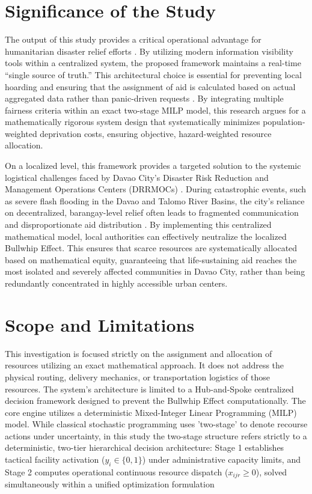 \section{Significance of the Study}
The output of this study provides a critical operational advantage for humanitarian disaster relief efforts \cite{starr2014}. By utilizing modern information visibility tools within a centralized system, the proposed framework maintains a real-time ``single source of truth.'' This architectural choice is essential for preventing local hoarding and ensuring that the assignment of aid is calculated based on actual aggregated data rather than panic-driven requests \cite{sahin2023, wagenaar2017}. By integrating multiple fairness criteria within an exact two-stage MILP model, this research argues for a mathematically rigorous system design that systematically minimizes population-weighted deprivation costs, ensuring objective, hazard-weighted resource allocation.

On a localized level, this framework provides a targeted solution to the systemic logistical challenges faced by Davao City's Disaster Risk Reduction and Management Operations Centers (DRRMOCs) \cite{samson2024}. During catastrophic events, such as severe flash flooding in the Davao and Talomo River Basins, the city's reliance on decentralized, barangay-level relief often leads to fragmented communication and disproportionate aid distribution \cite{cayamanda2021}. By implementing this centralized mathematical model, local authorities can effectively neutralize the localized Bullwhip Effect. This ensures that scarce resources are systematically allocated based on mathematical equity, guaranteeing that life-sustaining aid reaches the most isolated and severely affected communities in Davao City, rather than being redundantly concentrated in highly accessible urban centers.

\section{Scope and Limitations}
This investigation is focused strictly on the assignment and allocation of resources utilizing an exact mathematical approach. It does not address the physical routing, delivery mechanics, or transportation logistics of those resources. The system's architecture is limited to a Hub-and-Spoke centralized decision framework designed to prevent the Bullwhip Effect computationally. The core engine utilizes a deterministic Mixed-Integer Linear Programming (MILP) model. While classical stochastic programming uses 'two-stage' to denote recourse actions under uncertainty, in this study the two-stage structure refers strictly to a deterministic, two-tier hierarchical decision architecture: Stage 1 establishes tactical facility activation ($y_i \in \{0, 1\}$) under administrative capacity limits, and Stage 2 computes operational continuous resource dispatch ($x_{ijr} \ge 0$), solved simultaneously within a unified optimization formulation

